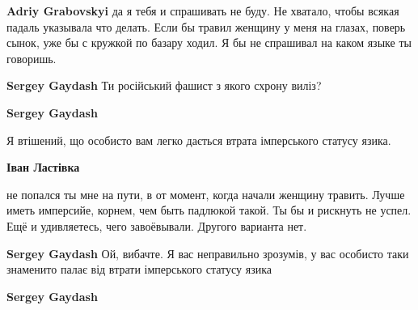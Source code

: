 \begin{itemize}
\begin{itemize}
\textbf{Adriy Grabovskyi} да я тебя и спрашивать не буду. Не хватало, чтобы
всякая падаль указывала что делать. Если бы травил женщину у меня на глазах,
поверь сынок, уже бы с кружкой по базару ходил. Я бы не спрашивал на каком
языке ты говоришь.

 
\textbf{Sergey Gaydash} Ти російський фашист з якого схрону виліз?

 
\textbf{Sergey Gaydash} 

Я втішений, що особисто вам легко дається втрата імперського статусу язика.


 
\textbf{Іван Ластівка} 

не попался ты мне на пути, в от момент, когда начали женщину травить. Лучше
иметь имперсийе, корнем, чем быть падлюкой такой. Ты бы и рискнуть не успел.
Ещё и удивляетесь, чего завоёвывали. Другого варианта нет.


 
\textbf{Sergey Gaydash} Ой, вибачте. Я вас неправильно зрозумів, у вас особисто
таки знаменито палає від втрати імперського статусу язика

 
\textbf{Sergey Gaydash} 


\end{itemize}
\end{itemize}
